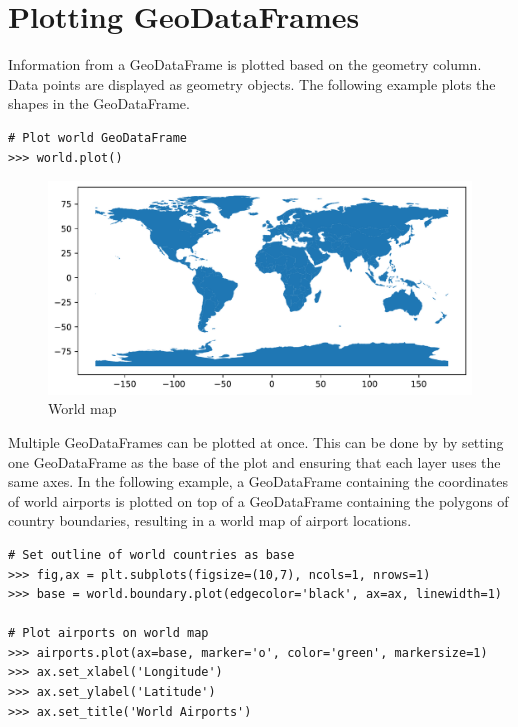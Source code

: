 \section*{Plotting GeoDataFrames} %

Information from a GeoDataFrame is plotted based on the geometry column.
Data points are displayed as geometry objects.
The following example plots the shapes in the  GeoDataFrame.

\begin{lstlisting}
# Plot world GeoDataFrame
>>> world.plot()
\end{lstlisting}

\begin{figure}[H]
\begin{center}
\includegraphics[scale=.55]{figures/worldmap.pdf}
\end{center}
\label{world-map}
\caption{World map}
\end{figure}

Multiple GeoDataFrames can be plotted at once.
This can be done by by setting one GeoDataFrame as the base of the plot and ensuring that each layer uses the same axes.
In the following example, a GeoDataFrame containing the coordinates of world airports is plotted on top of a GeoDataFrame containing the polygons of country boundaries, resulting in a world map of airport locations.

\begin{lstlisting}
# Set outline of world countries as base
>>> fig,ax = plt.subplots(figsize=(10,7), ncols=1, nrows=1)
>>> base = world.boundary.plot(edgecolor='black', ax=ax, linewidth=1)

# Plot airports on world map
>>> airports.plot(ax=base, marker='o', color='green', markersize=1)
>>> ax.set_xlabel('Longitude')
>>> ax.set_ylabel('Latitude')
>>> ax.set_title('World Airports')
\end{lstlisting}

